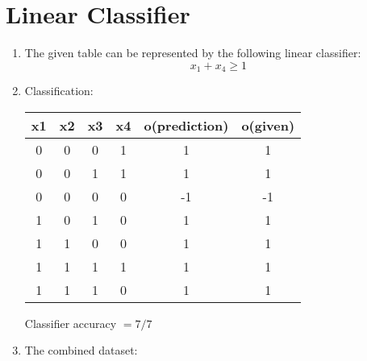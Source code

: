
\newpage
\section{Linear Classifier}
\label{sec:q2}

\begin{enumerate}
\item The given table can be represented by the following linear classifier:\\
$$
x_1+ x_4\geq 1
$$

\item Classification:\\

 \begin{table}[h]
        \centering
        \begin{tabular}{cccc|c|c}
            x1 & x2 & x3 & x4 & o(prediction)	& o(given)  \\ \hline
            0  & 0  & 0  & 1  & 1 			    & 1  \\
            0  & 0  & 1  & 1  & 1				& 1  \\
            0  & 0  & 0  & 0  & -1				& -1 \\
            1  & 0  & 1  & 0  & 1				& 1  \\
            1  & 1  & 0  & 0  & 1				& 1  \\
            1  & 1  & 1  & 1  & 1				& 1  \\
            1  & 1  & 1  & 0  & 1				& 1  \\
        \end{tabular}
        \end{table}

Classifier accuracy $= 7/7$

\item

The combined dataset: \\


\end{enumerate}
